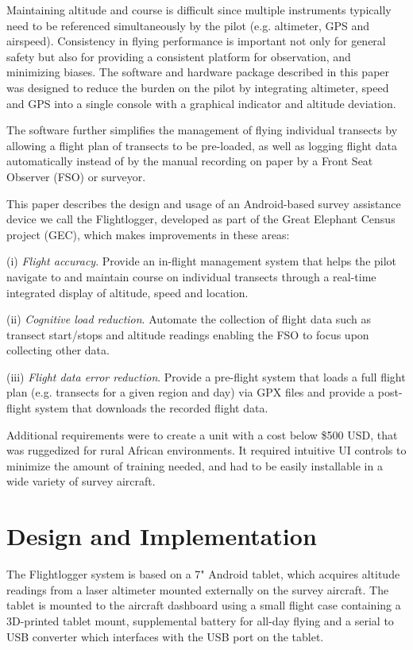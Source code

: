 \documentclass{sig-alternate-2013}
\begin{document}
Maintaining altitude and course is difficult since multiple instruments typically need to be referenced simultaneously by the pilot (e.g. altimeter, GPS and airspeed).  Consistency in flying performance is important not only for general safety but also for providing a consistent platform for observation, and minimizing biases. The software and hardware package described in this paper was designed to reduce the burden on the pilot by integrating altimeter, speed and GPS into a single console with a graphical indicator and altitude deviation.  

The software further simplifies the management of flying individual transects by allowing a flight plan of transects to be pre-loaded, as well as logging flight data automatically instead of by the manual recording on paper by a Front Seat Observer (FSO) or surveyor.  

This paper describes the design and usage of an Android-based survey assistance device we call the Flightlogger, developed as part of the Great Elephant Census project (GEC), which makes improvements in these areas:

(i) \textit{Flight accuracy}. Provide an in-flight management system that helps the pilot navigate to and maintain course on individual transects through a real-time integrated display of altitude, speed and location.

(ii) \textit{Cognitive load reduction}. Automate the collection of flight data such as transect start/stops and altitude readings enabling the FSO to focus upon collecting other data.

(iii) \textit{Flight data error reduction}. Provide a pre-flight system that loads a full flight plan (e.g. transects for a given region and day) via GPX files and provide a post-flight system that downloads the recorded flight data.

Additional requirements were to create a unit with a cost below \$500 USD, that was ruggedized for rural African environments. It required intuitive UI controls to minimize the amount of training needed, and had to be easily installable in a wide variety of survey aircraft.
\section{Design and Implementation}
The Flightlogger system is based on a 7" Android tablet, which acquires altitude readings from a laser altimeter mounted externally on the survey aircraft.  The tablet is mounted to the aircraft dashboard using a small flight case containing a 3D-printed tablet mount, supplemental battery for all-day flying and a serial to USB converter which interfaces with the USB port on the tablet.
\end{document}
